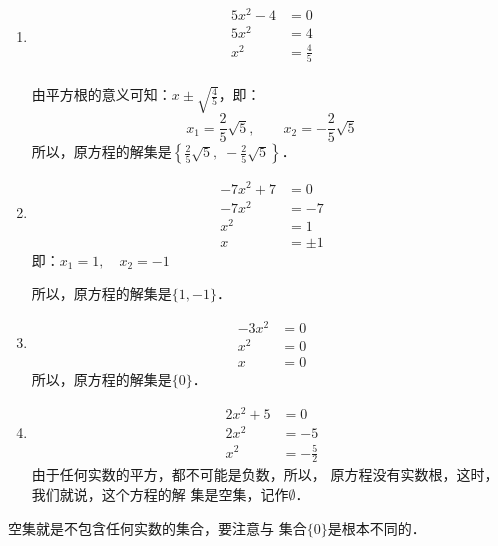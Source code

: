 \begin{solution}
\begin{enumerate}
    \item 
    \begin{align*}
        5x^2-4&=0\\
        5x^2&=4\tag{移项}\\
        x^2&=\frac{4}{5} \tag{两边除以5}\\
    \end{align*}

    由平方根的意义可知：$x\pm\sqrt{\frac{4}{5}}$，即：
\[ x_1=\frac{2}{5}\sqrt{5},\qquad x_2=-\frac{2}{5}\sqrt{5} \]
所以，原方程的解集是$\left\{\frac{2}{5}\sqrt{5},\; -\frac{2}{5}\sqrt{5}\right\}$．

\item \begin{align*}
    -7x^2+7&=0\\
    -7x^2&=-7\tag{移项变号}\\
    x^2&=1\tag{两边除以$-7$}\\
    x&=\pm 1 \tag{平方根的意义}
\end{align*}
即：$x_1=1,\quad x_2=-1$

所以，原方程的解集是$\{1,-1\}$．

\item \begin{align*}
    -3x^2&=0\\
    x^2&=0 \tag{两边除以$-3$}\\
    x&=0
\end{align*}
所以，原方程的解集是$\{0\}$．

\item \begin{align*}
    2x^2+5&=0\\
2x^2&=-5  \tag{移项变号}\\
x^2&=-\frac{5}{2} \tag{两边除以2}
\end{align*}
由于任何实数的平方，都不可能是负数，所以，
原方程没有实数根，这时，我们就说，这个方程的解
集是空集，记作$\emptyset$．
\end{enumerate}
\end{solution}

\begin{rmk}
    空集就是不包含任何实数的集合，要注意与
集合$\{0\}$是根本不同的．
\end{rmk}

